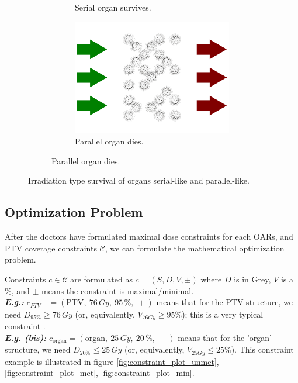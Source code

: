 \begin{figure}
\begin{subfigure}[b]{0.48\textwidth}
\begin{subfigure}[b]{0.55\textwidth}
			\vspace{0.5mm}
			\caption{Serial organ survives.}
		\end{subfigure}
		\vbar
		\begin{subfigure}[b]{0.35\textwidth}
			\addtocounter{subfigure}{-1}
			\renewcommand\thesubfigure{\alph{subfigure}2}
			\centering
			\includegraphics[width=\textwidth]{parallel_heat_square_post.pdf}
			\caption{Parallel organ dies.}
		\end{subfigure}	
	\end{subfigure}
	\addtocounter{subfigure}{-1}
	\caption{Irradiation type survival of organs serial-like and parallel-like.}
	\label{fig:serial_parallel_organ_radiation}
\end{figure}

\subsection{Optimization Problem}
After the doctors have formulated maximal dose constraints for each OARs, and PTV coverage constraints $\mathcal{C}$, we can formulate the mathematical optimization problem.

Constraints $c \in \mathcal{C}$ are formulated as $c = \left( S, D, V, \pm \right)$ where $D$ is in Grey, $V$ is a \%, and $\pm$ means the constraint is maximal/minimal.
\\
\textit{\textbf{E.g.:}} $c_{PTV+} = \left( \text{PTV}, \ 76\,Gy, \ 95\,\%, \ + \right)$ means that for the PTV structure, we need $D_{95\%} \geq 76\,\textit{Gy}$ (or, equivalently, $V_{76\textit{Gy}} \geq 95 \%$); this is a very typical constraint \cite{Zhao2016}.
\\
\textit{\textbf{E.g. (bis):}} $c_{\text{organ}} = \left( \text{organ}, \ 25\, Gy, \ 20\,\%, \ - \right)$ means that for the 'organ' structure, we need $D_{20\%} \leq 25\,\textit{Gy}$ (or, equivalently, $V_{25\textit{Gy}} \leq 25 \%$).
This constraint example is illustrated in figure \ref{fig:constraint_plot_unmet}, \ref{fig:constraint_plot_met}, \ref{fig:constraint_plot_min}.

